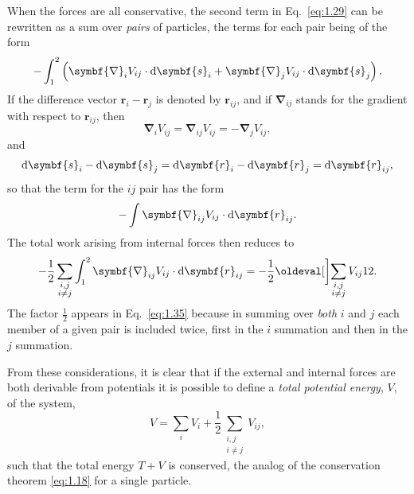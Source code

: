 When the forces are all conservative, the second term in Eq.~\eqref{eq:1.29} can be rewritten as a sum over \emph{pairs} of particles, the terms for each pair being of the form
\begin{equation*}
    -\int_1^2\left(\symbf{\nabla}_iV_{ij}\cdot\odif{\symbf{s}_{i}}+\symbf{\nabla}_jV_{ij}\cdot\odif{\symbf{s}_j}\right).
\end{equation*}
If the difference vector \(\symbf{r}_i-\symbf{r}_j\) is denoted by \(\symbf{r}_{ij}\), and if \(\symbf{\nabla}_{ij}\) stands for the gradient with respect to \(\symbf{r}_{ij}\), then
\begin{equation*}
    \symbf{\nabla}_iV_{ij}=\symbf{\nabla}_{ij}V_{ij}=-\symbf{\nabla}_jV_{ij},
\end{equation*}
and
\begin{equation*}
    \odif{\symbf{s}_i}-\odif{\symbf{s}_j}=\odif{\symbf{r}_i}-\odif{\symbf{r}_j}=\odif{\symbf{r}_{ij}},
\end{equation*}
so that the term for the \(ij\) pair has the form
\begin{equation*}
    -\int\symbf{\nabla}_{ij}V_{ij}\cdot\odif{\symbf{r}_{ij}}.
\end{equation*}
The total work arising from internal forces then reduces to
\begin{equation}
    -\frac{1}{2}\sum_{\substack{i,j\\i\ne j}}\int_1^2\symbf{\nabla}_{ij}V_{ij}\cdot\odif{\symbf{r}_{ij}}=-\frac{1}{2}\eval[\bigg]{\sum_{\substack{i,j\\i\ne j}}V_{ij}}[1][2].\label{eq:1.35}
\end{equation}
The factor \(\frac{1}{2}\) appears in Eq.~\eqref{eq:1.35} because in summing over \emph{both} \(i\) and \(j\) each member of a given pair is included twice, first in the \(i\) summation and then in the \(j\) summation.

From these considerations, it is clear that if the external and internal forces are both derivable from potentials it is possible to define a \emph{total potential energy}, \(V\), of the system,
\begin{equation}
    V=\sum_iV_i+\frac{1}{2}\sum_{\substack{i,j\\i\ne j}}V_{ij},\label{eq:1.36}
\end{equation}
such that the total energy \(T+V\) is conserved, the analog of the conservation theorem \eqref{eq:1.18} for a single particle.

